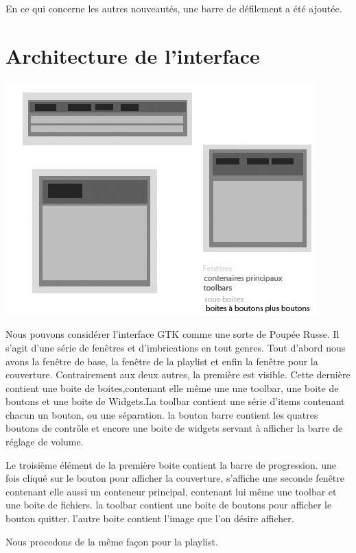 \documentclass[12pt,a4paper]{report}
\begin{document}
En ce qui concerne les autres nouveautés, une barre de défilement a été ajoutée.

\section{Architecture de l'interface}



\begin{center}
\includegraphics[scale =0.8]{archi.jpg}
\end{center}


Nous pouvons considérer l'interface GTK comme une sorte de Poupée Russe. Il s'agit d'une série de fenêtres et d'imbrications en tout genres.
Tout d'abord nous avons la fenêtre de base, la fenêtre de la playlist et enfin la fenêtre pour la couverture. Contrairement aux deux autres, la première est visible.
Cette dernière contient une boite de boites,contenant elle même une une toolbar, une boite de boutons et une boite de Widgets.La toolbar contient une série d'items contenant chacun un bouton, ou une séparation.
la bouton barre contient les quatres boutons de contrôle et encore une boite de widgets servant à afficher la barre de réglage de volume.

Le troisième élément de  la première boite contient la barre de progression.
une fois cliqué sur le bouton pour afficher la couverture, s'affiche une seconde fenêtre contenant elle aussi un conteneur principal, contenant lui même une toolbar et une boite de fichiers. la toolbar contient une boite de boutons pour afficher le bouton quitter. l'autre boite contient l'image que l'on désire afficher.

Nous procedons de la même façon pour la playlist.
\end{document}
